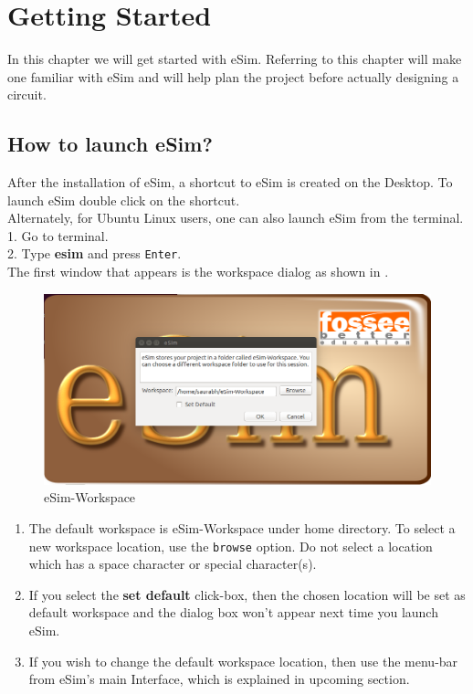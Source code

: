 \chapter {Getting Started}
\thispagestyle{empty}
\label{chap4}

In this chapter we will get started with eSim. Referring to
this chapter will make one familiar with eSim and will help
plan the project before actually designing a circuit. 

\section{How to launch eSim?}
After the installation of eSim, a shortcut to eSim is created 
on the Desktop. To launch eSim double click on the shortcut.\\ 
Alternately, for Ubuntu Linux users, one can also launch eSim from the terminal.\\
1. Go to terminal.\\
2. Type \textbf{esim} and press {\tt Enter}.\\

The first window that appears is the workspace dialog as shown in 
. 
\begin{figure}[h]
\centering
\includegraphics[width=\lgfig]{workspace.png} 
\caption{eSim-Workspace}
\label{workspace}
\end{figure}
\begin{enumerate}
\item The default workspace is eSim-Workspace under home directory. 
To select a new workspace location, use the {\tt browse} option. Do not select a location which has a space character or special character(s). 
\item If you select the \textbf{set default} click-box, then the chosen location will be set as default workspace and the dialog box won't appear next time you launch eSim.
\item If you wish to change the default workspace location, then use the menu-bar from eSim's main Interface, which is explained in upcoming section.
\end{enumerate}
